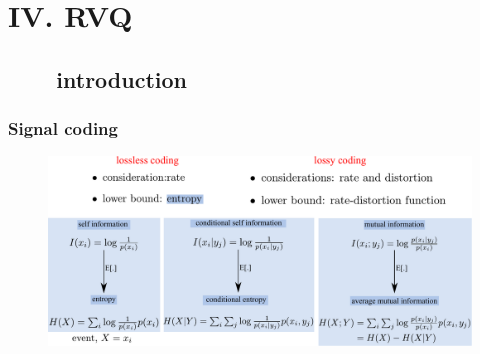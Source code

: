 \section{IV. RVQ}
\subsection{\ \ \ \ introduction}

\begin{frame}[plain]
\frametitle{Signal coding}
\logoCSIPCPL\mypagenum
	\begin{changemargin}{-1.3in}{0in}
		\begin{figure}				
			\includegraphics[width=1.3\textwidth]{figs/IT_entropy.pdf}
		\end{figure}
	\end{changemargin}
\end{frame}





